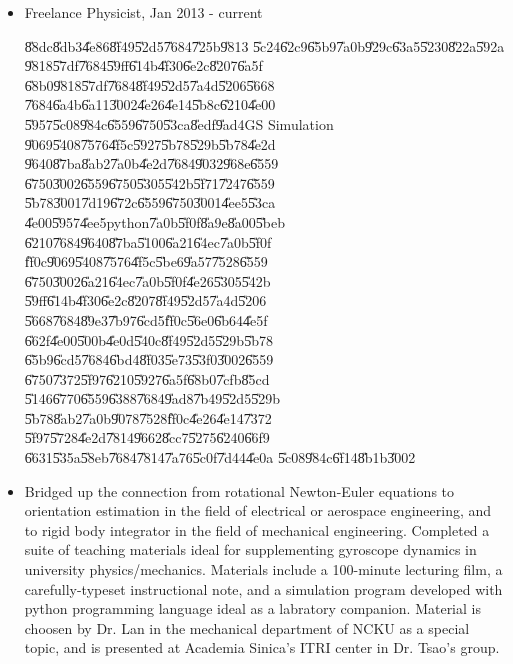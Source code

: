 \documentclass{sebase}
\begin{document}
\begin{itemize}
\item Freelance Physicist, Jan 2013 - current

\quad \U{88dc}\U{8db3}\U{4e86}\U{8f49}\U{52d5}\U{7684}\U{725b}\U{9813}%
\U{5c24}\U{62c9}\U{65b9}\U{7a0b}\U{929c}\U{63a5}\U{5230}\U{822a}\U{592a}%
\U{9818}\U{57df}\U{7684}\U{59ff}\U{614b}\U{4f30}\U{6e2c}\U{8207}\U{6a5f}%
\U{68b0}\U{9818}\U{57df}\U{7684}\U{8f49}\U{52d5}\U{7a4d}\U{5206}\U{5668}%
\U{7684}\U{6a4b}\U{6a11}\U{3002}\U{4e26}\U{4e14}\U{5b8c}\U{6210}\U{4e00}%
\U{5957}\U{5c08}\U{984c}\U{6559}\U{6750}\U{53ca}\U{8edf}\U{9ad4}GS Simulation%
\U{9069}\U{5408}\U{7576}\U{4f5c}\U{5927}\U{5b78}\U{529b}\U{5b78}\U{4e2d}%
\U{9640}\U{87ba}\U{8ab2}\U{7a0b}\U{4e2d}\U{7684}\U{9032}\U{968e}\U{6559}%
\U{6750}\U{3002}\U{6559}\U{6750}\U{5305}\U{542b}\U{5f71}\U{7247}\U{6559}%
\U{5b78}\U{3001}\U{7d19}\U{672c}\U{6559}\U{6750}\U{3001}\U{4ee5}\U{53ca}%
\U{4e00}\U{5957}\U{4ee5}python\U{7a0b}\U{5f0f}\U{8a9e}\U{8a00}\U{5beb}%
\U{6210}\U{7684}\U{9640}\U{87ba}\U{5100}\U{6a21}\U{64ec}\U{7a0b}\U{5f0f}%
\U{ff0c}\U{9069}\U{5408}\U{7576}\U{4f5c}\U{5be6}\U{9a57}\U{7528}\U{6559}%
\U{6750}\U{3002}\U{6a21}\U{64ec}\U{7a0b}\U{5f0f}\U{4e26}\U{5305}\U{542b}%
\U{59ff}\U{614b}\U{4f30}\U{6e2c}\U{8207}\U{8f49}\U{52d5}\U{7a4d}\U{5206}%
\U{5668}\U{7684}\U{89e3}\U{7b97}\U{6cd5}\U{ff0c}\U{56e0}\U{6b64}\U{4e5f}%
\U{662f}\U{4e00}\U{500b}\U{4e0d}\U{540c}\U{8f49}\U{52d5}\U{529b}\U{5b78}%
\U{65b9}\U{6cd5}\U{7684}\U{6bd4}\U{8f03}\U{5e73}\U{53f0}\U{3002}\U{6559}%
\U{6750}\U{7372}\U{5f97}\U{6210}\U{5927}\U{6a5f}\U{68b0}\U{7cfb}\U{85cd}%
\U{5146}\U{6770}\U{6559}\U{6388}\U{7684}\U{9ad8}\U{7b49}\U{52d5}\U{529b}%
\U{5b78}\U{8ab2}\U{7a0b}\U{9078}\U{7528}\U{ff0c}\U{4e26}\U{4e14}\U{7372}%
\U{5f97}\U{5728}\U{4e2d}\U{7814}\U{9662}\U{8cc7}\U{5275}\U{6240}\U{66f9}%
\U{6631}\U{535a}\U{58eb}\U{7684}\U{7814}\U{7a76}\U{5c0f}\U{7d44}\U{4e0a}%
\U{5c08}\U{984c}\U{6f14}\U{8b1b}\U{3002}

\item Bridged up the connection from rotational Newton-Euler equations to
orientation estimation in the field of electrical or aerospace engineering,
and to rigid body integrator in the field of mechanical engineering.
Completed a suite of teaching materials ideal for supplementing gyroscope
dynamics in university physics/mechanics. Materials include a 100-minute
lecturing film, a carefully-typeset instructional note, and a simulation
program developed with python programming language ideal as a labratory
companion. Material is choosen by Dr. Lan in the mechanical department of
NCKU as a special topic, and is presented at Academia Sinica's ITRI center
in Dr. Tsao's group.


\end{itemize}
\end{document}
